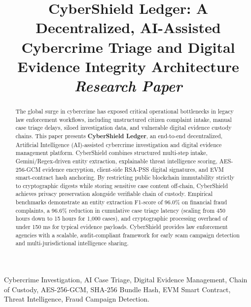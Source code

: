 \documentclass[conference]{IEEEtran}
\begin{document}
\title{CyberShield Ledger: A Decentralized, AI-Assisted Cybercrime Triage and Digital Evidence Integrity Architecture\\
{\footnotesize \textnormal{\textit{Research Paper}}}
}

\author{
\and
{}
}

\maketitle

\begin{abstract}
The global surge in cybercrime has exposed critical operational bottlenecks in legacy law enforcement workflows, including unstructured citizen complaint intake, manual case triage delays, siloed investigation data, and vulnerable digital evidence custody chains. This paper presents \textbf{CyberShield Ledger}, an end-to-end decentralized, Artificial Intelligence (AI)-assisted cybercrime investigation and digital evidence management platform. CyberShield combines structured multi-step intake, Gemini/Regex-driven entity extraction, explainable threat intelligence scoring, AES-256-GCM evidence encryption, client-side RSA-PSS digital signatures, and EVM smart-contract hash anchoring. By restricting public blockchain immutability strictly to cryptographic digests while storing sensitive case content off-chain, CyberShield achieves privacy preservation alongside verifiable chain of custody. Empirical benchmarks demonstrate an entity extraction F1-score of 96.0\% on financial fraud complaints, a 96.6\% reduction in cumulative case triage latency (scaling from 450 hours down to 15 hours for 1,000 cases), and cryptographic processing overhead of under 150 ms for typical evidence payloads. CyberShield provides law enforcement agencies with a scalable, audit-compliant framework for early scam campaign detection and multi-jurisdictional intelligence sharing.
\end{abstract}

\begin{IEEEkeywords}
Cybercrime Investigation, AI Case Triage, Digital Evidence Management, Chain of Custody, AES-256-GCM, SHA-256 Bundle Hash, EVM Smart Contract, Threat Intelligence, Fraud Campaign Detection.
\end{IEEEkeywords}
\end{document}
